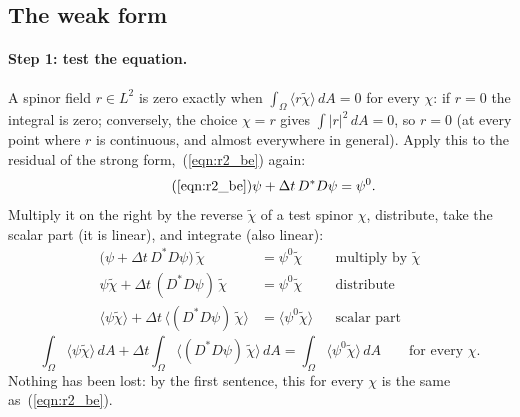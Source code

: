 \subsection{The weak form}

\paragraph{Step 1: test the equation.} A spinor field $r \in L^2$ is zero exactly when $\int_\Omega\langle r\widetilde\chi\rangle\, dA = 0$ for every $\chi$: if $r = 0$ the integral is zero; conversely, the choice $\chi = r$ gives $\int|r|^2\, dA = 0$, so $r = 0$ (at every point where $r$ is continuous, and almost everywhere in general). Apply this to the residual of the strong form,~(\ref{eqn:r2_be}) again:
\begin{equation*}
\tag{\ref{eqn:r2_be}}
\psi + \Delta t\, D^*D\psi = \psi^0 .
\end{equation*}
Multiply it on the right by the reverse $\widetilde\chi$ of a test spinor $\chi$, distribute, take the scalar part (it is linear), and integrate (also linear):
\begin{align*}
\big(\psi + \Delta t\, D^*D\psi\big)\,\widetilde\chi &= \psi^0\widetilde\chi && \text{multiply by } \widetilde\chi \\
\psi\widetilde\chi + \Delta t\,(D^*D\psi)\,\widetilde\chi &= \psi^0\widetilde\chi && \text{distribute} \\
\langle\psi\widetilde\chi\rangle + \Delta t\,\big\langle (D^*D\psi)\,\widetilde\chi\big\rangle &= \langle\psi^0\widetilde\chi\rangle && \text{scalar part}
\end{align*}
\begin{equation*}
\int_\Omega \langle\psi\widetilde\chi\rangle\, dA + \Delta t\int_\Omega \big\langle (D^*D\psi)\,\widetilde\chi\big\rangle\, dA = \int_\Omega \langle\psi^0\widetilde\chi\rangle\, dA \qquad\text{for every } \chi .
\end{equation*}
Nothing has been lost: by the first sentence, this for every $\chi$ is the same as~(\ref{eqn:r2_be}).

